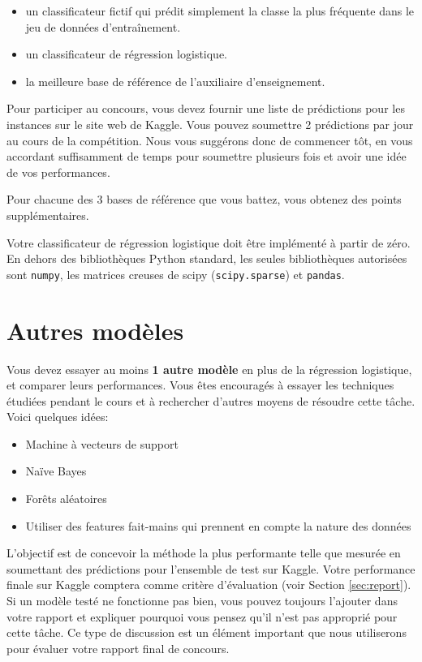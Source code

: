 \documentclass[12pt]{article}
\begin{document}
\begin{itemize}
    \item un classificateur fictif qui prédit simplement la classe la plus fréquente dans le jeu de données d'entraînement.
    \item un classificateur de régression logistique.
    \item la meilleure base de référence de l'auxiliaire d’enseignement.
\end{itemize}

Pour participer au concours, vous devez fournir une liste de  prédictions pour les instances sur le site web de Kaggle. Vous pouvez soumettre 2 prédictions par jour au cours de la compétition. Nous vous suggérons donc de commencer tôt, en vous accordant suffisamment de temps pour soumettre plusieurs fois et avoir une idée de vos performances.

Pour chacune des 3 bases de référence que vous battez, vous obtenez des points supplémentaires.

Votre classificateur de régression logistique doit être implémenté à partir de zéro. En dehors des bibliothèques Python standard, les seules bibliothèques autorisées sont \texttt{numpy}, les matrices creuses de scipy (\texttt{scipy.sparse}) et \texttt{pandas}. 

\section{Autres modèles}
 
Vous devez essayer au moins \textbf{1 autre modèle} en plus de la régression logistique, et comparer leurs performances. Vous êtes encouragés à essayer les techniques étudiées pendant le cours et à rechercher d'autres moyens de résoudre cette tâche. Voici quelques idées:

\begin{itemize}
    \item Machine à vecteurs de support
    \item Na\"ive Bayes
    \item Forêts aléatoires
    \item Utiliser des features fait-mains qui prennent en compte la nature des données
\end{itemize}

L'objectif est de concevoir la méthode la plus performante telle que mesurée en soumettant des prédictions pour l'ensemble de test sur Kaggle. Votre performance finale sur Kaggle comptera comme critère d'évaluation (voir Section \ref{sec:report}). Si un modèle testé ne fonctionne pas bien, vous pouvez toujours l'ajouter dans votre rapport et expliquer pourquoi vous pensez qu'il n'est pas approprié pour cette tâche. Ce type de discussion est un élément important que nous utiliserons pour évaluer votre rapport final de concours.
\end{document}
